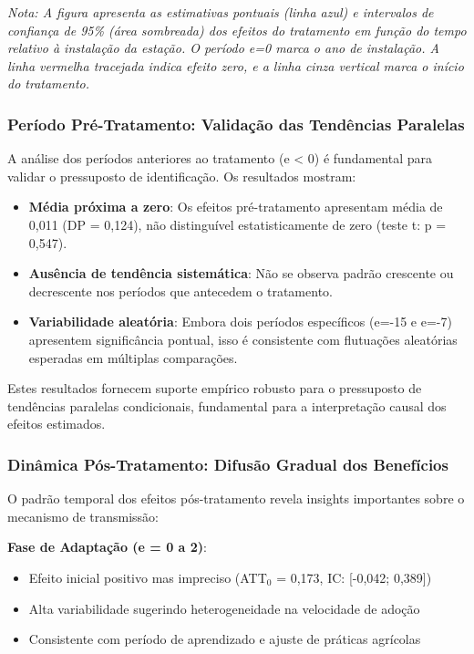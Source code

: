 \documentclass[
	12pt,				%
	openright,			%
	oneside,			%
	a4paper,			%
	english,			%
	french,				%
	spanish,			%
	brazil				%
	]{abntex2}
\begin{document}
\textit{Nota: A figura apresenta as estimativas pontuais (linha azul) e intervalos de confiança de 95\% (área sombreada) dos efeitos do tratamento em função do tempo relativo à instalação da estação. O período e=0 marca o ano de instalação. A linha vermelha tracejada indica efeito zero, e a linha cinza vertical marca o início do tratamento.}

\subsubsection{Período Pré-Tratamento: Validação das Tendências Paralelas}

A análise dos períodos anteriores ao tratamento (e < 0) é fundamental para validar o pressuposto de identificação. Os resultados mostram:

\begin{itemize}
\item \textbf{Média próxima a zero}: Os efeitos pré-tratamento apresentam média de 0,011 (DP = 0,124), não distinguível estatisticamente de zero (teste t: p = 0,547).

\item \textbf{Ausência de tendência sistemática}: Não se observa padrão crescente ou decrescente nos períodos que antecedem o tratamento.

\item \textbf{Variabilidade aleatória}: Embora dois períodos específicos (e=-15 e e=-7) apresentem significância pontual, isso é consistente com flutuações aleatórias esperadas em múltiplas comparações.
\end{itemize}

Estes resultados fornecem suporte empírico robusto para o pressuposto de tendências paralelas condicionais, fundamental para a interpretação causal dos efeitos estimados.

\subsubsection{Dinâmica Pós-Tratamento: Difusão Gradual dos Benefícios}

O padrão temporal dos efeitos pós-tratamento revela insights importantes sobre o mecanismo de transmissão:

\textbf{Fase de Adaptação (e = 0 a 2)}:
\begin{itemize}
\item Efeito inicial positivo mas impreciso (ATT$_0$ = 0,173, IC: [-0,042; 0,389])
\item Alta variabilidade sugerindo heterogeneidade na velocidade de adoção
\item Consistente com período de aprendizado e ajuste de práticas agrícolas
\end{itemize}
\end{document}
